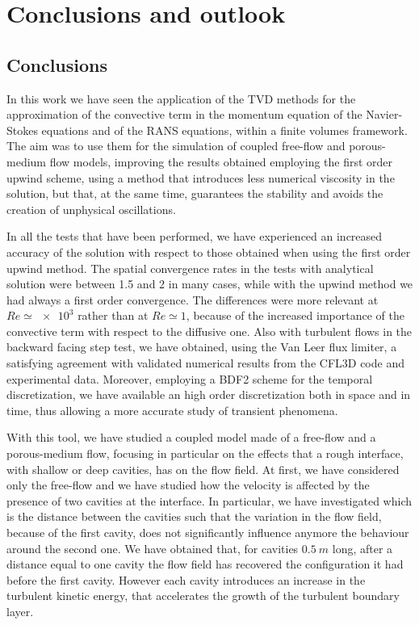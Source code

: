 \chapter{Conclusions and outlook}
\section{Conclusions}
In this work we have seen the application of the TVD methods for the 
approximation of the convective term in the momentum equation of the 
Navier-Stokes equations and of the RANS equations, within a finite volumes 
framework. The aim was to use them for the simulation of coupled free-flow and 
porous-medium flow models, improving the results obtained employing the 
first order upwind scheme, using a method that introduces less numerical 
viscosity in the solution, but that, at the same time, guarantees the stability 
and avoids the creation of unphysical oscillations.

In all the tests that have been performed, we have experienced an increased 
accuracy of the solution with respect to those obtained when using the first order 
upwind method. The spatial convergence rates in the tests with analytical 
solution were between 1.5 and 2 in many cases, while with the upwind method we had always a first order convergence. 
The differences were more relevant at $Re\simeq\num{e3}$ rather than at 
$Re\simeq1$, because of the increased importance of the convective term with 
respect to the diffusive one. Also with turbulent flows in the backward facing 
step test, we have 
obtained, using the Van Leer flux limiter, a satisfying agreement with 
validated numerical results from the CFL3D code and experimental data.
Moreover, employing a BDF2 scheme for the 
temporal discretization, we have available an high order discretization both 
in space and in time, thus allowing a more accurate study of transient 
phenomena.

With this tool, we have studied a coupled model made of a free-flow and a 
porous-medium flow, focusing in particular on the effects that a rough
interface, with shallow or deep cavities, has on the flow field.
At first, we have considered only the free-flow and we have studied how the 
velocity is affected by the presence of two cavities at the interface.
In particular, we have investigated which is the distance between the cavities such that the variation in the flow field, 
because of the first cavity, does not significantly influence anymore the 
behaviour around the 
second one. We have obtained that, for cavities $\SI{0.5}{m}$ long, after a 
distance equal to one cavity the flow field has recovered the configuration it 
had before the first cavity. However each cavity introduces an increase in the 
turbulent kinetic energy, that accelerates the growth of the turbulent 
boundary layer.

